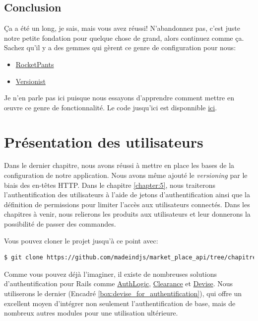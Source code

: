 \documentclass[]{report}
\begin{document}
    \section{Conclusion}

      Ça a été un long, je sais, mais vous avez réussi! N'abandonnez pas, c'est juste notre petite fondation pour quelque chose de grand, alors continuez comme ça. Sachez qu'il y a des gemmes qui gèrent ce genre de configuration pour nous:

    \begin{itemize}
      \item \href{https://github.com/Sutto/rocket_pants}{RocketPants}
      \item \href{https://github.com/bploetz/versionist}{Versionist}
    \end{itemize}

    Je n'en parle pas ici puisque nous essayons d'apprendre comment mettre en œuvre ce genre de fonctionnalité. Le code jusqu'ici est disponnible \href{https://github.com/madeindjs/market_place_api/commit/124873774b578af3df21136df5ee80f4d50da3bd}{ici}.

\chapter{Présentation des utilisateurs}\label{chapter:3}

  Dans le dernier chapitre, nous avons réussi à mettre en place les bases de la configuration de notre application. Nous avons même ajouté le \textit{versioning} par le biais des en-têtes HTTP. Dans le chapitre \ref{chapter:5}, nous traiterons l'authentification des utilisateurs à l'aide de jetons d'authentification ainsi que la définition de permissions pour limiter l'accès aux utilisateurs  connectés. Dans les chapitres à venir, nous relierons les produits aux utilisateurs et leur donnerons la possibilité de passer des commandes.

  Vous pouvez cloner le projet jusqu'à ce point avec:

  \begin{scriptsize}
    \begin{lstlisting}[language=bash]
    $ git clone https://github.com/madeindjs/market_place_api/tree/chapitre_2
    \end{lstlisting}
  \end{scriptsize}

  Comme vous pouvez déjà l'imaginer, il existe de nombreuses solutions d'authentification pour Rails comme \href{https://github.com/binarylogic/authlogic}{AuthLogic}, \href{https://github.com/thoughtbot/clearance}{Clearance} et \href{https://github.com/plataformatec/devise}{Devise}. Nous utiliserons le dernier (Encadré \ref{box:devise_for_authentification}), qui offre un excellent moyen d'intégrer non seulement l'authentification de base, mais de nombreux autres modules pour une utilisation ultérieure.
\end{document}
